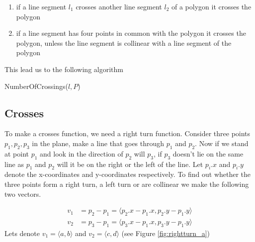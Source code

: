 \begin{enumerate}
	\item if a line segment $l_1$ crosses another line segment $l_2$ of a polygon it 
	      crosses the polygon
	\item if a line segment has four points in common with the polygon it crosses the
		  polygon, unless the line segment is collinear with a line segment of the
		  polygon 
\end{enumerate}

This lead us to the following algorithm
\begin{algorithm} 
	\caption{NumberOfCrossings($l,P$)}
	\begin{algorithmic}[1] 
		\State {}
	\end{algorithmic}
\end{algorithm}

\subsection{Crosses}
To make a crosses function, we need a right turn function. Consider three
points $p_1,p_2,p_3$ in the plane, make a line that goes through $p_1$ and $p_2$. 
Now if we stand at point $p_1$ and look in the direction of $p_2$ will $p_3$, if $p_3$
doesn't lie on the same line as $p_1$ and $p_2$ will it be on the
right or the left of the line. Let $p_i.x$ and $p_i.y$ denote the x-coordinates
and y-coordinates respectively. To find out whether the three points form a right turn, 
a left turn or are collinear we make the following two vectors.

\begin{align*}
	v_1 &=p_2-p_1 = \langle p_2.x-p_1.x,p_2.y-p_1.y\rangle\\
	v_2 &=p_3-p_1 = \langle p_3.x-p_1.x,p_3.y-p_1.y\rangle
\end{align*}
Lets denote $v_1 = \langle a,b\rangle$ and $v_2 = \langle c,d\rangle$
(see Figure \ref{fig:rightturn_a})

